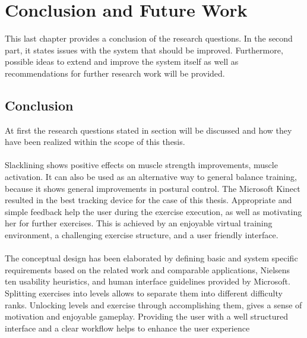 \chapter{Conclusion and Future Work}\label{7_conclusion}
This last chapter provides a conclusion of the research questions.
In the second part, it states issues with the system that should be improved.
Furthermore, possible ideas to extend and improve the system itself as well as recommendations for further research work will be provided.

\section{Conclusion}
At first the research questions stated in section \textit{} will be discussed and how they have been realized within the scope of this thesis.

\subsubsection{}
Slacklining shows positive effects on muscle strength improvements, muscle activation.
It can also be used as an alternative way to general balance training, because it shows general improvements in postural control.
The Microsoft Kinect resulted in the best tracking device for the case of this thesis.
Appropriate and simple feedback help the user during the exercise execution, as well as motivating her for further exercises.
This is achieved by an enjoyable virtual training environment, a challenging exercise structure, and a user friendly interface.


\subsubsection{}
The conceptual design has been elaborated by defining basic and system specific requirements based on the related work and comparable applications, Nielsens ten usability heuristics, and human interface guidelines provided by Microsoft.
Splitting exercises into levels allows to separate them into different difficulty ranks.
Unlocking levels and exercise through accomplishing them, gives a sense of motivation and enjoyable gameplay.
Providing the user with a well structured interface and a clear workflow helps to enhance the user experience

